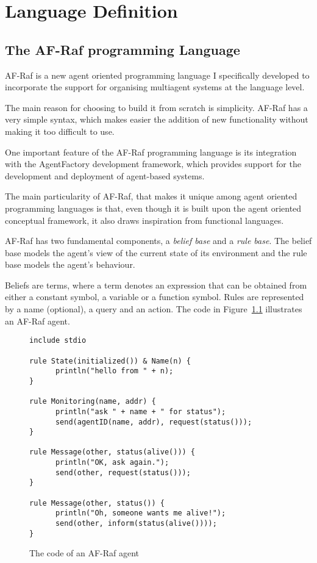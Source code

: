\documentclass[a4paper,12pt,oneside]{book} %
\theoremstyle{remark}
\theoremstyle{plain}
\begin{document}
\chapter{Language Definition}\label{ch:method} %
\section{The AF-Raf programming Language} %

AF-Raf is a new agent oriented programming language I specifically
developed to incorporate the support for organising multiagent
systems at the language level.

The main reason for choosing to build it from scratch is simplicity.  AF-Raf
has a very simple syntax, which makes easier the addition of new functionality
without making it too difficult to use.

One important feature of the AF-Raf programming language is its integration
with the AgentFactory development framework, which provides support for the
development and deployment of agent-based systems.

The main particularity of AF-Raf, that makes it unique among agent oriented
programming languages is that, even though it is built upon the agent
oriented conceptual framework, it also draws inspiration from functional
languages.

AF-Raf has two fundamental components, a \textit{belief base}
and a \textit{rule base}. The belief base models the agent's view of the
current state of its environment and the rule base models the agent's
behaviour.

Beliefs are terms, where a term denotes an expression that can be obtained from
either a constant symbol, a variable or a function symbol. Rules are
represented by a name (optional), a query and an action.  The code in
Figure~\ref{fig:AF-Raf} illustrates an AF-Raf agent.

\begin{figure}\footnotesize %
\begin{verbatim}
include stdio

rule State(initialized()) & Name(n) {
      println("hello from " + n);
}

rule Monitoring(name, addr) {
      println("ask " + name + " for status");
      send(agentID(name, addr), request(status()));
}

rule Message(other, status(alive())) {
      println("OK, ask again.");
      send(other, request(status()));
}

rule Message(other, status()) {
      println("Oh, someone wants me alive!");
      send(other, inform(status(alive())));
}
\end{verbatim}
\caption{The code of an AF-Raf agent}
\label{fig:AF-Raf}
\end{figure} %
\end{document}
